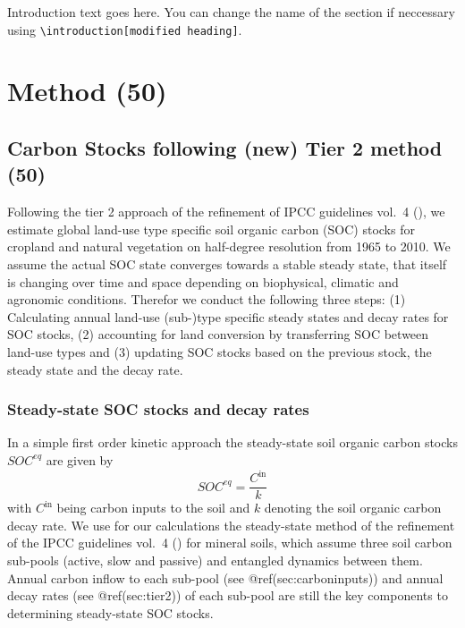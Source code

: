 \documentclass[gc, manuscript]{copernicus}
\begin{document}


\newpage

\introduction

Introduction text goes here. You can change the name of the section if
neccessary using
\texttt{\textbackslash{}introduction{[}modified\ heading{]}}. \newpage

\section{Method (50)}

\hypertarget{sec:carbonbudget}{%
\subsection{Carbon Stocks following (new) Tier 2 method
(50)}\label{sec:carbonbudget}}

Following the tier 2 approach of the refinement of IPCC guidelines
vol.~4 (\citet{ipcc_2019_2019}), we estimate global land-use type
specific soil organic carbon (SOC) stocks for cropland and natural
vegetation on half-degree resolution from 1965 to 2010. We assume the
actual SOC state converges towards a stable steady state, that itself is
changing over time and space depending on biophysical, climatic and
agronomic conditions. Therefor we conduct the following three steps: (1)
Calculating annual land-use (sub-)type specific steady states and decay
rates for SOC stocks, (2) accounting for land conversion by transferring
SOC between land-use types and (3) updating SOC stocks based on the
previous stock, the steady state and the decay rate.

\subsubsection{Steady-state SOC stocks and decay rates}

In a simple first order kinetic approach the steady-state soil organic
carbon stocks \(SOC^{eq}\) are given by \begin{equation}
SOC^{eq} =\frac{C^{\textrm{in}}}{k}
\label{eq:inoutflow}
\end{equation} with \(C^{\textrm{in}}\) being carbon inputs to the soil
and \(k\) denoting the soil organic carbon decay rate. We use for our
calculations the steady-state method of the refinement of the IPCC
guidelines vol.~4 (\citet{ipcc_2019_2019}) for mineral soils, which
assume three soil carbon sub-pools (active, slow and passive) and
entangled dynamics between them. Annual carbon inflow to each sub-pool
(see @ref(sec:carboninputs)) and annual decay rates (see
@ref(sec:tier2)) of each sub-pool are still the key components to
determining steady-state SOC stocks.
\end{document}
